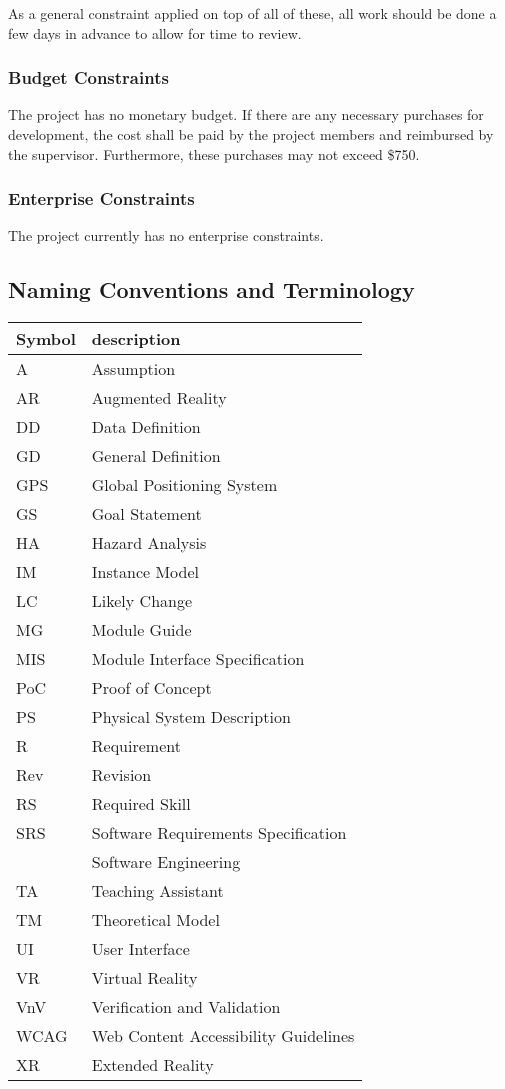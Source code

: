 \documentclass[12pt]{article}
\begin{document}
\noindent
As a general constraint applied on top of all of these, all work should be done a few days in advance to allow for time to review. 

\subsubsection{Budget Constraints}
The project has no monetary budget. If there are any necessary purchases for development, the cost
shall be paid by the project members and reimbursed by the supervisor. Furthermore, these purchases
may not exceed \$750.

\subsubsection{Enterprise Constraints}
The project currently has no enterprise constraints. 

\subsection{Naming Conventions and Terminology}
\label{Naming_Convention_Table}
\renewcommand{\arraystretch}{1.2}
\begin{tabular}{l l} 
  \toprule		
  \textbf{Symbol} & \textbf{description}\\
  \midrule 
  A & Assumption\\
  AR & Augmented Reality\\
  DD & Data Definition\\
  GD & General Definition\\
  GPS & Global Positioning System\\
  GS & Goal Statement\\
  HA & Hazard Analysis\\
  IM & Instance Model\\
  LC & Likely Change\\
  MG & Module Guide\\
  MIS & Module Interface Specification\\
  PoC & Proof of Concept \\ 
  PS & Physical System Description\\
  R & Requirement\\
  Rev & Revision\\
  RS & Required Skill\\
  SRS & Software Requirements Specification\\
  \progname{} & Software Engineering\\
  TA & Teaching Assistant\\
  TM & Theoretical Model\\
  UI & User Interface\\
  VR & Virtual Reality\\
  VnV & Verification and Validation \\
  WCAG & Web Content Accessibility Guidelines \\
  XR & Extended Reality\\
  \bottomrule
\end{tabular}\\
\end{document}
